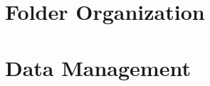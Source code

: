 \documentclass[
]{book}
\begin{document}
\hypertarget{folder-organization}{%
\section{Folder Organization}\label{folder-organization}}

\hypertarget{data-management}{%
\section{Data Management}\label{data-management}}

  
\end{document}
